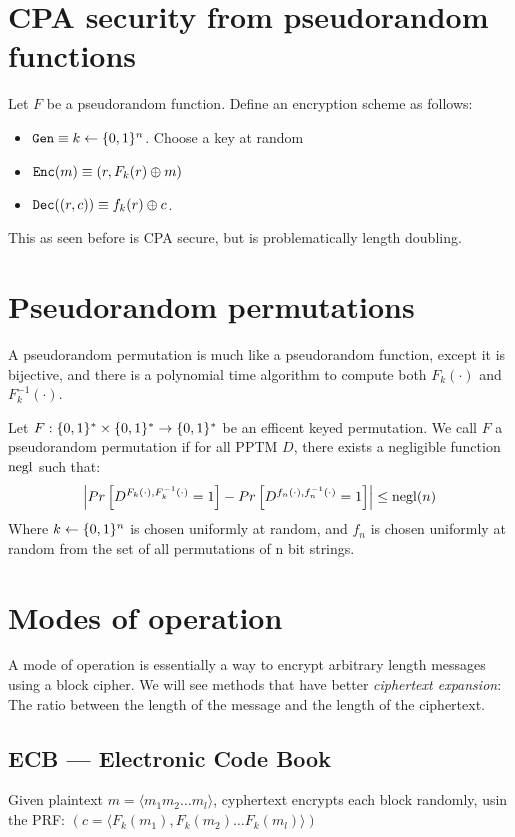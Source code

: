 \section{CPA security from pseudorandom functions}
Let $F$ be a pseudorandom function. Define an encryption scheme as follows:
\begin{itemize}
\item $\texttt{Gen} \equiv k \leftarrow \{0, 1\}^n$. Choose a key at random
\item $\texttt{Enc}(m) \equiv ( r, F_k(r) \oplus m)$
\item $\texttt{Dec}((r, c)) \equiv f_k(r) \oplus c$.
\end{itemize}

This as seen before is CPA secure, but is problematically length doubling.

\section{Pseudorandom permutations}
A pseudorandom permutation is much like a pseudorandom function, except it
is bijective, and there is a polynomial time algorithm to compute both
$F_k(\cdot)$ and $F_k^{-1}(\cdot)$.

\begin{definition}
    Let $F: \{0, 1\}^* \times \{0, 1\}^* \rightarrow \{0, 1\}^*$ be an efficent
    keyed permutation. We call $F$ a pseudorandom permutation if for all
    PPTM $D$, there exists a negligible function $\operatorname{negl}$ such that:
    \begin{align*}
        \left| Pr\left[ D^{F_k(\cdot), F_k^{-1}(\cdot)} = 1 \right] - 
        Pr\left[ D^{f_n(\cdot), f_n^{-1}(\cdot)} = 1 \right] \right| \leq \operatorname{negl}(n)
    \end{align*}
    Where $k \leftarrow \{0, 1\}^n$ is chosen uniformly at random, and $f_n$
    is chosen uniformly at random from the set of all permutations of n
    bit strings.
\end{definition}

\section{Modes of operation}
A mode of operation is essentially a way to encrypt arbitrary length
messages using a block cipher. We will see methods that have better
\emph{ciphertext expansion}: The ratio between  the length of the message
and the length of the ciphertext.

\subsection{ECB --- Electronic Code Book} 
Given plaintext $m = \langle m_1 m_2 \dots m_l \rangle$, cyphertext
encrypts each block randomly, usin the PRF: $(c = \langle F_k(m_1), F_k(m_2) \dots F_k(m_l) \rangle)$

